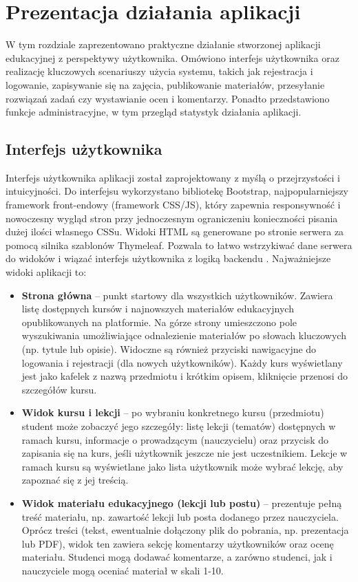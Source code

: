 \chapter{Prezentacja działania aplikacji} W tym rozdziale zaprezentowano praktyczne działanie stworzonej aplikacji edukacyjnej z perspektywy użytkownika. Omówiono interfejs użytkownika oraz realizację kluczowych scenariuszy użycia systemu, takich jak rejestracja i logowanie, zapisywanie się na zajęcia, publikowanie materiałów, przesyłanie rozwiązań zadań czy wystawianie ocen i komentarzy. Ponadto przedstawiono funkcje administracyjne, w tym przegląd statystyk działania aplikacji. \section{Interfejs użytkownika} Interfejs użytkownika aplikacji został zaprojektowany z myślą o przejrzystości i intuicyjności. Do interfejsu wykorzystano bibliotekę Bootstrap, najpopularniejszy framework front-endowy (framework CSS/JS), który zapewnia responsywność i nowoczesny wygląd stron przy jednoczesnym ograniczeniu konieczności pisania dużej ilości własnego CSSu. Widoki HTML są generowane po stronie serwera za pomocą silnika szablonów Thymeleaf. Pozwala to łatwo wstrzykiwać dane serwera do widoków i wiązać interfejs użytkownika z logiką backendu \cite{thymeleaf-docs}. Najważniejsze widoki aplikacji to: \begin{itemize}
\item \textbf{Strona główna} – punkt startowy dla wszystkich użytkowników. Zawiera listę dostępnych kursów i najnowszych materiałów edukacyjnych opublikowanych na platformie. Na górze strony umieszczono pole wyszukiwania umożliwiające odnalezienie materiałów po słowach kluczowych (np. tytule lub opisie). Widoczne są również przyciski nawigacyjne do logowania i rejestracji (dla nowych użytkowników). Każdy kurs wyświetlany jest jako kafelek z nazwą przedmiotu i krótkim opisem, kliknięcie przenosi do szczegółów kursu.
\item \textbf{Widok kursu i lekcji} – po wybraniu konkretnego kursu (przedmiotu) student może zobaczyć jego szczegóły: listę lekcji (tematów) dostępnych w ramach kursu, informacje o prowadzącym (nauczycielu) oraz przycisk do zapisania się na kurs, jeśli użytkownik jeszcze nie jest uczestnikiem. Lekcje w ramach kursu są wyświetlane jako lista użytkownik może wybrać lekcję, aby zapoznać się z jej treścią.
\item \textbf{Widok materiału edukacyjnego (lekcji lub postu)} – prezentuje pełną treść materiału, np. zawartość lekcji lub posta dodanego przez nauczyciela. Oprócz treści (tekst, ewentualnie dołączony plik do pobrania, np. prezentacja lub PDF), widok ten zawiera sekcję komentarzy użytkowników oraz ocenę materiału. Studenci mogą dodawać komentarze, a zarówno studenci, jak i nauczyciele mogą oceniać materiał w skali 1-10.

\end{itemize}
